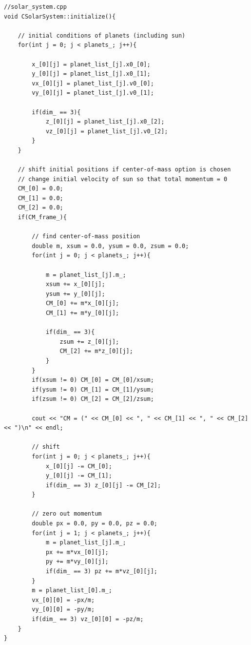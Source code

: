 \documentclass[prb,aps,twocolumn,showpacs,10pt]{revtex4-1}
\begin{document}
\begin{lstlisting}
//solar_system.cpp
void CSolarSystem::initialize(){

	// initial conditions of planets (including sun)
	for(int j = 0; j < planets_; j++){

		x_[0][j] = planet_list_[j].x0_[0];
		y_[0][j] = planet_list_[j].x0_[1];
		vx_[0][j] = planet_list_[j].v0_[0];
		vy_[0][j] = planet_list_[j].v0_[1];

		if(dim_ == 3){
			z_[0][j] = planet_list_[j].x0_[2];
			vz_[0][j] = planet_list_[j].v0_[2];		
		}
	}

	// shift initial positions if center-of-mass option is chosen
	// change initial velocity of sun so that total momentum = 0
	CM_[0] = 0.0;
	CM_[1] = 0.0;
	CM_[2] = 0.0;
	if(CM_frame_){

		// find center-of-mass position
		double m, xsum = 0.0, ysum = 0.0, zsum = 0.0;
		for(int j = 0; j < planets_; j++){

			m = planet_list_[j].m_;
			xsum += x_[0][j];
			ysum += y_[0][j];
			CM_[0] += m*x_[0][j];
			CM_[1] += m*y_[0][j];

			if(dim_ == 3){
				zsum += z_[0][j];
				CM_[2] += m*z_[0][j];
			}
		}
		if(xsum != 0) CM_[0] = CM_[0]/xsum;
		if(ysum != 0) CM_[1] = CM_[1]/ysum;
		if(zsum != 0) CM_[2] = CM_[2]/zsum;

		cout << "CM = (" << CM_[0] << ", " << CM_[1] << ", " << CM_[2] << ")\n" << endl;

		// shift
		for(int j = 0; j < planets_; j++){
			x_[0][j] -= CM_[0];
			y_[0][j] -= CM_[1];
			if(dim_ == 3) z_[0][j] -= CM_[2];
		}

		// zero out momentum
		double px = 0.0, py = 0.0, pz = 0.0;
		for(int j = 1; j < planets_; j++){
			m = planet_list_[j].m_;
			px += m*vx_[0][j];
			py += m*vy_[0][j];
			if(dim_ == 3) pz += m*vz_[0][j];
		}
		m = planet_list_[0].m_;
		vx_[0][0] = -px/m;
		vy_[0][0] = -py/m;
		if(dim_ == 3) vz_[0][0] = -pz/m;
	}
}
\end{lstlisting}
\end{document}
